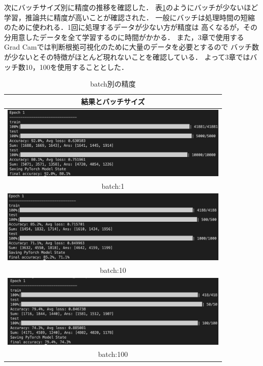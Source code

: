 次にバッチサイズ別に精度の推移を確認した．
表\ref{batch}のようにバッチが少ないほど学習，推論共に精度が高いことが確認された．
一般にバッチは処理時間の短縮のために使われる．1回に処理するデータが少ない方が精度は
高くなるが，その分用意したデータを全て学習するのに時間がかかる．
また，3章で使用するGrad Camでは判断根拠可視化のために大量のデータを必要とするので
バッチ数が少ないとその特徴がほとんど現れないことを確認している．
よって3章ではバッチ数10，100を使用することとした．

\begin{table}[b]
  \begin{center}
    \begin{tabular}{|c|} \hline
      結果とバッチサイズ \\ \hline
        \includegraphics[width=110mm]{images/net_result/batch1.png} \\ batch:1 \\ \hline
        \includegraphics[width=110mm]{images/net_result/batch10.png} \\ batch:10 \\ \hline
        \includegraphics[width=110mm]{images/net_result/batch100.png} \\ batch:100 \\ \hline
    \end{tabular}
  \end{center}
  \caption{batch別の精度}
  \label{batch}
\end{table}
\clearpage

